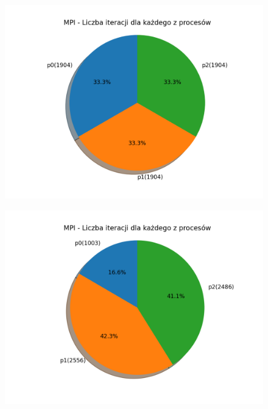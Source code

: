 \documentclass[11pt, a4paper, oneside]{article}
\begin{document}
\begin{figure}[H]
\centering
\begin{minipage}[b]{\dimexpr.5\textwidth-1em}
  \centering
  \includegraphics[width=1\linewidth]{grafiki/MPI_PSO_T2/MPI_PSO_T2_procIter.png}
  \label{fig:trajektoriaWybrana:PSO2}
\end{minipage} \hfill
\begin{minipage}[b]{\dimexpr.5\textwidth-1em}
  \centering
  \includegraphics[width=1\linewidth]{grafiki/MPI_MC_T2/MPI_MC_T2_procIter.png}
  \label{fig:trajektoriaWybrana:MC2}
\end{minipage}
\end{figure}
\end{document}

